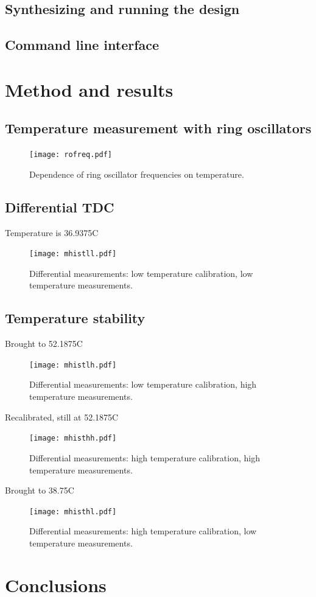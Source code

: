 \documentclass[a4paper,11pt]{article}
\begin{document}
\subsection{Synthesizing and running the design}

\subsection{Command line interface}

\section{Method and results}

\subsection{Temperature measurement with ring oscillators}

\begin{figure}[h]
\texttt{[image: rofreq.pdf]}
\caption{Dependence of ring oscillator frequencies on temperature.}
\label{fig:rofreq}
\end{figure}

\subsection{Differential TDC}

Temperature is 36.9375C
\begin{figure}[h]
\texttt{[image: mhistll.pdf]}
\caption{Differential measurements: low temperature calibration, low temperature measurements.}
\label{fig:mhistll}
\end{figure}

\subsection{Temperature stability}

Brought to 52.1875C
\begin{figure}[h]
\texttt{[image: mhistlh.pdf]}
\caption{Differential measurements: low temperature calibration, high temperature measurements.}
\label{fig:mhistlh}
\end{figure}

Recalibrated, still at 52.1875C
\begin{figure}[h]
\texttt{[image: mhisthh.pdf]}
\caption{Differential measurements: high temperature calibration, high temperature measurements.}
\label{fig:mhisthh}
\end{figure}

Brought to 38.75C
\begin{figure}[h]
\texttt{[image: mhisthl.pdf]}
\caption{Differential measurements: high temperature calibration, low temperature measurements.}
\label{fig:mhisthl}
\end{figure}

\section{Conclusions}
\end{document}

